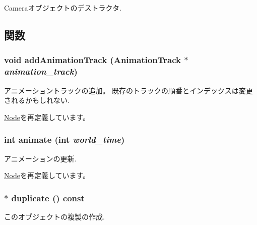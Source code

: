 Cameraオブジェクトのデストラクタ. 

\subsection{関数}
\hypertarget{classm3g_1_1Camera_415c0b110f95410ded9b85e5d99a496b}{
\subsubsection[{addAnimationTrack}]{\setlength{\rightskip}{0pt plus 5cm}void addAnimationTrack ({\bf AnimationTrack} $\ast$ {\em animation\_\-track})}}
\label{classm3g_1_1Camera_415c0b110f95410ded9b85e5d99a496b}


アニメーショントラックの追加。 既存のトラックの順番とインデックスは変更されるかもしれない. 

\hyperlink{classm3g_1_1Node_415c0b110f95410ded9b85e5d99a496b}{Node}を再定義しています。\hypertarget{classm3g_1_1Camera_8aad1ceab4c2a03609c8a42324ce484d}{
\subsubsection[{animate}]{\setlength{\rightskip}{0pt plus 5cm}int animate (int {\em world\_\-time})}}
\label{classm3g_1_1Camera_8aad1ceab4c2a03609c8a42324ce484d}


アニメーションの更新. 

\hyperlink{classm3g_1_1Node_8aad1ceab4c2a03609c8a42324ce484d}{Node}を再定義しています。\hypertarget{classm3g_1_1Camera_6279f7f8ab52af683fadd193d7694f2d}{
\subsubsection[{duplicate}]{ $\ast$ duplicate () const}}
\label{classm3g_1_1Camera_6279f7f8ab52af683fadd193d7694f2d}


このオブジェクトの複製の作成. 

